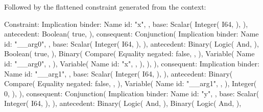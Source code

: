 \documentclass[
  oneside,
  english,
  coorientadorbanca,
  noabntexcite
]{ufsc-thesis-rn46-2019}
\begin{document}
Followed by the flattened constraint generated from the context:

\begin{rustcode}
Constraint: Implication {
    binder: Name {
        id: "x",
    },
    base: Scalar(
        Integer(
            I64,
        ),
    ),
    antecedent: Boolean(
        true,
    ),
    consequent: Conjunction(
        Implication {
            binder: Name {
                id: "__arg0",
            },
            base: Scalar(
                Integer(
                    I64,
                ),
            ),
            antecedent: Binary(
                Logic(
                    And,
                ),
                Boolean(
                    true,
                ),
                Binary(
                    Compare(
                        Equality {
                            negated: false,
                        },
                    ),
                    Variable(
                        Name {
                            id: "__arg0",
                        },
                    ),
                    Variable(
                        Name {
                            id: "x",
                        },
                    ),
                ),
            ),
            consequent: Implication {
                binder: Name {
                    id: "__arg1",
                },
                base: Scalar(
                    Integer(
                        I64,
                    ),
                ),
                antecedent: Binary(
                    Compare(
                        Equality {
                            negated: false,
                        },
                    ),
                    Variable(
                        Name {
                            id: "__arg1",
                        },
                    ),
                    Integer(
                        0,
                    ),
                ),
                consequent: Conjunction(
                    Implication {
                        binder: Name {
                            id: "y",
                        },
                        base: Scalar(
                            Integer(
                                I64,
                            ),
                        ),
                        antecedent: Binary(
                            Logic(
                                And,
                            ),
                            Binary(
                                Logic(
                                    And,
                                ),
}}}}
\end{rustcode}
\end{document}
